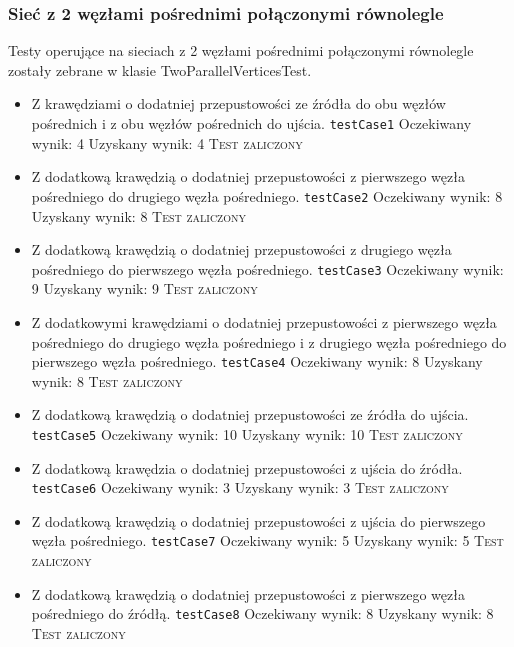 \subsubsection{Sieć z 2 węzłami pośrednimi połączonymi równolegle}
Testy operujące na sieciach z 2 węzłami pośrednimi połączonymi równolegle zostały
zebrane w klasie TwoParallelVerticesTest.
\begin{itemize}[nosep]
    \item Z krawędziami o dodatniej przepustowości ze źródła do obu węzłów
    pośrednich i z obu węzłów pośrednich do ujścia.
    \texttt{testCase1}
    Oczekiwany wynik: 4
    Uzyskany wynik: 4
    \textsc{Test zaliczony}


    \item Z dodatkową krawędzią o dodatniej przepustowości z pierwszego węzła
    pośredniego do drugiego węzła pośredniego.
    \texttt{testCase2}
    Oczekiwany wynik: 8
    Uzyskany wynik: 8
    \textsc{Test zaliczony}

    \item Z dodatkową krawędzią o dodatniej przepustowości z drugiego węzła
    pośredniego do pierwszego węzła pośredniego.
    \texttt{testCase3}
    Oczekiwany wynik: 9
    Uzyskany wynik: 9
    \textsc{Test zaliczony}

    \item Z dodatkowymi krawędziami o dodatniej przepustowości z pierwszego
    węzła pośredniego do drugiego węzła pośredniego i z drugiego węzła
    pośredniego do pierwszego węzła pośredniego.
    \texttt{testCase4}
    Oczekiwany wynik: 8
    Uzyskany wynik: 8
    \textsc{Test zaliczony}

    \item Z dodatkową krawędzią o dodatniej przepustowości ze źródła do ujścia.
    \texttt{testCase5}
    Oczekiwany wynik: 10
    Uzyskany wynik: 10
    \textsc{Test zaliczony}

    \item Z dodatkową krawędzia o dodatniej przepustowości z ujścia do źródła.
    \texttt{testCase6}
    Oczekiwany wynik: 3
    Uzyskany wynik: 3
    \textsc{Test zaliczony}

    \item Z dodatkową krawędzią o dodatniej przepustowości z ujścia do
    pierwszego węzła pośredniego.
    \texttt{testCase7}
    Oczekiwany wynik: 5
    Uzyskany wynik: 5
    \textsc{Test zaliczony}

    \item Z dodatkową krawędzią o dodatniej przepustowości z pierwszego węzła
    pośredniego do źródłą.
    \texttt{testCase8}
    Oczekiwany wynik: 8
    Uzyskany wynik: 8
    \textsc{Test zaliczony}


\end{itemize}
